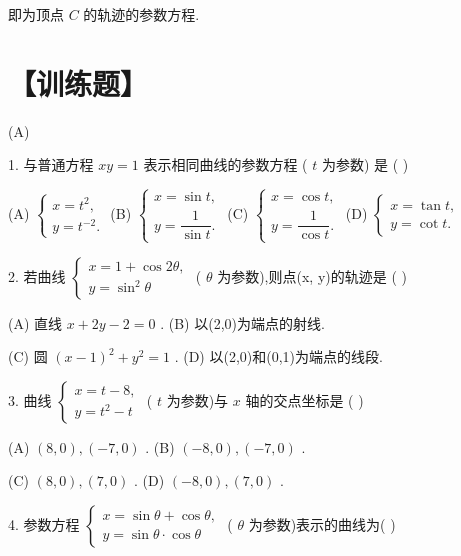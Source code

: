 即为顶点 $C$ 的轨迹的参数方程.

\section*{【训练题】}

(A)

1. 与普通方程 ${xy} = 1$ 表示相同曲线的参数方程 ( $t$ 为参数) 是 (   )

(A) $\left\{  \begin{array}{l} x = {t}^{2}, \\  y = {t}^{-2}. \end{array}\right.$ (B) $\left\{  \begin{array}{l} x = \sin t, \\  y = \dfrac{1}{\sin t}. \end{array}\right.$ (C) $\left\{  \begin{array}{l} x = \cos t, \\  y = \dfrac{1}{\cos t}. \end{array}\right.$ (D) $\left\{  \begin{array}{l} x = \tan t, \\  y = \cot t. \end{array}\right.$

2. 若曲线 $\left\{  \begin{array}{l} x = 1 + \cos {2\theta }, \\  y = {\sin }^{2}\theta  \end{array}\right.$ ( $\theta$ 为参数),则点(x, y)的轨迹是 (   )

(A) 直线 $x + {2y} - 2 = 0$ . (B) 以(2,0)为端点的射线.

(C) 圆 ${\left( x - 1\right) }^{2} + {y}^{2} = 1$ . (D) 以(2,0)和(0,1)为端点的线段.

3. 曲线 $\left\{  \begin{array}{l} x = t - 8, \\  y = {t}^{2} - t \end{array}\right.$ ( $t$ 为参数)与 $x$ 轴的交点坐标是 (   )

(A) $\left( {8,0}\right) ,\left( {-7,0}\right)$ . (B) $\left( {-8,0}\right) ,\left( {-7,0}\right)$ .

(C) $\left( {8,0}\right) ,\left( {7,0}\right)$ . (D) $\left( {-8,0}\right) ,\left( {7,0}\right)$ .

4. 参数方程 $\left\{  \begin{array}{l} x = \sin \theta  + \cos \theta , \\  y = \sin \theta  \cdot  \cos \theta  \end{array}\right.$ ( $\theta$ 为参数)表示的曲线为(   )

